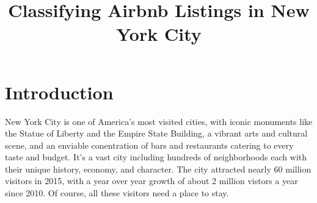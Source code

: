 \documentclass[conference]{IEEEtran}
\begin{document}
%
\title{Classifying Airbnb Listings in New York City}


\author{
}



\maketitle

\begin{abstract}

\end{abstract}

\section{Introduction}
\IEEEPARstart
New York City is one of America's most visited cities, with iconic monuments like the
Statue of Liberty and the Empire State Building, a vibrant arts and cultural scene,
and an enviable conentration of bars and restaurants catering to every taste and budget.
It's a vast city including hundreds of neighborhoods each with their unique
history, economy, and character. The city attracted nearly 60 million visitors in 2015,
with a year over year growth of about 2 million vistors a year since 2010.\cite{nyc_and_company_nyc_nodate} Of course,
all these visitors need a place to stay.
\end{document}
